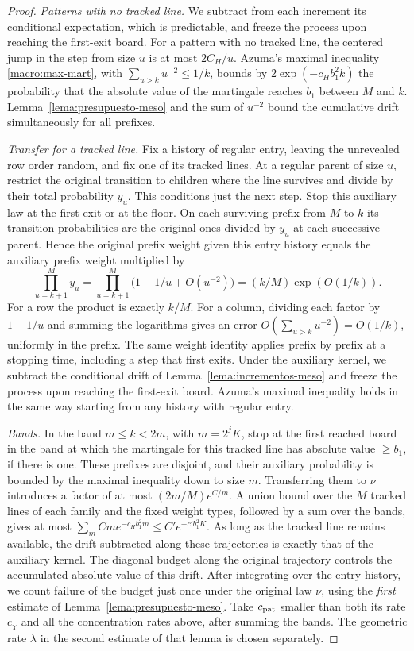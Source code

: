 \begin{proof}
\emph{Patterns with no tracked line.} We subtract from each increment its conditional expectation,
which is predictable, and freeze the
process upon reaching the first-exit board. For a pattern with no tracked line, the centered jump in
the step from size $u$ is at most $2C_H/u$. Azuma's maximal inequality \eqref{macro:max-mart}, with
$\sum_{u>k}u^{-2}\le1/k$, bounds by $2\exp(-c_H b_1^2k)$ the probability that the absolute value of
the martingale reaches $b_1$ between $M$ and $k$.
Lemma~\ref{lema:presupuesto-meso} and the sum of $u^{-2}$ bound the cumulative drift simultaneously for all
prefixes.

\emph{Transfer for a tracked line.} Fix a history of regular entry, leaving the unrevealed row
order random, and fix one of its tracked
lines. At a regular parent of size $u$, restrict the original transition to children where the line
survives and divide by their total probability $y_u$. This conditions just the next step. Stop this
auxiliary law at the first exit or at the floor. On each surviving prefix from $M$ to $k$ its
transition probabilities are the original ones divided by $y_u$ at each successive parent. Hence the
original prefix weight given this entry history equals the auxiliary prefix weight multiplied by
\[
 \prod_{u=k+1}^{M}y_u
 =\prod_{u=k+1}^{M}\big(1-1/u+O(u^{-2})\big)
 =(k/M)\exp(O(1/k)).
\]
For a row the product is exactly $k/M$. For a column, dividing each factor by $1-1/u$ and summing
the logarithms gives an error $O(\sum_{u>k}u^{-2})=O(1/k)$, uniformly in the prefix. The same weight
identity applies prefix by prefix at a stopping time, including a step that first exits. Under the
auxiliary kernel, we subtract the conditional drift of
Lemma~\ref{lema:incrementos-meso} and freeze the process upon reaching the first-exit board. Azuma's
maximal inequality holds in the same way starting from any history with regular entry.

\emph{Bands.} In the band $m\le k<2m$, with $m=2^jK$, stop at the first reached board in the band
at which the
martingale for this tracked line has absolute value $\ge b_1$, if there is one. These prefixes are
disjoint, and their auxiliary probability is bounded by the maximal inequality down to size $m$.
Transferring them to $\nu$ introduces a factor of at most $(2m/M)e^{C/m}$. A union bound over the $M$
tracked lines of each family and the fixed weight types, followed by a sum over the bands, gives at most
$\sum_m C m e^{-c_H b_1^2 m}\le C'e^{-c' b_1^2K}$. As long as the tracked line remains available,
the drift subtracted along these trajectories is exactly that of the auxiliary kernel. The diagonal
budget along the original trajectory controls the accumulated absolute value of this drift. After
integrating over the entry history, we count failure of the budget just once under the original law
$\nu$, using the \emph{first} estimate of Lemma~\ref{lema:presupuesto-meso}. Take $c_{\rm pat}$ smaller
than both its rate $c_\chi$ and all the concentration rates above, after summing the bands. The
geometric rate $\lambda$ in the second estimate of that lemma is chosen separately.
\end{proof}

